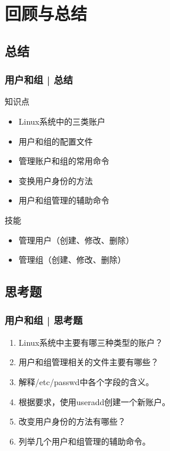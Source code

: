 \section{回顾与总结}
\subsection{总结}
\begin{frame}[label=current]
  \frametitle{用户和组 | 总结}
  \begin{block}{知识点}
    \begin{itemize}
      \item Linux系统中的三类账户
      \item 用户和组的配置文件
      \item 管理账户和组的常用命令
      \item 变换用户身份的方法
      \item 用户和组管理的辅助命令
    \end{itemize}
  \end{block}
  \begin{block}{技能}
    \begin{itemize}
      \item 管理用户（创建、修改、删除）
      \item 管理组（创建、修改、删除）
    \end{itemize}
  \end{block}
\end{frame}

\subsection{思考题}
\begin{frame}
  \frametitle{用户和组 | 思考题}
  \begin{enumerate}
    \item Linux系统中主要有哪三种类型的账户？
    \item 用户和组管理相关的文件主要有哪些？
    \item 解释/etc/passwd中各个字段的含义。
    \item 根据要求，使用useradd创建一个新账户。
    \item 改变用户身份的方法有哪些？
    \item 列举几个用户和组管理的辅助命令。
  \end{enumerate}
\end{frame}

